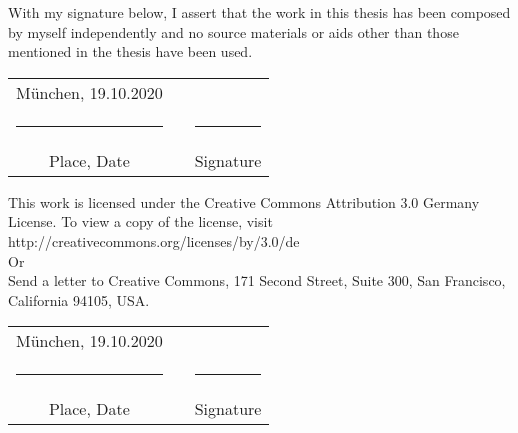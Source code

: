 \thispagestyle{plain}


\vspace*{1cm}
With my signature below, I assert that the work in this thesis has been composed by myself independently and no source materials or aids other than those mentioned in the thesis have been used.



\vspace{2cm}

\hspace{1cm}\begin{tabular}{ccc}
\vspace{-0.3cm}München, 19.10.2020 	&\hspace{4cm} 		& \\
\rule{4.5cm}{0.4pt}					&					&\rule{4.5cm}{0.4pt}\\
Place, Date							&					& Signature			
\end{tabular}

           		






\vspace{4cm}
This work is licensed under the Creative Commons Attribution 3.0 Germany License. To view a copy of the license, visit http://creativecommons.org/licenses/by/3.0/de\\

Or\\

Send a letter to Creative Commons, 171 Second Street, Suite 300, San Francisco, California 94105, USA.

\vspace{2cm}



\hspace{1cm}\begin{tabular}{ccc}
\vspace{-0.3cm}München, 19.10.2020 	&\hspace{4cm} 		& \\
\rule{4.5cm}{0.4pt}					&					&\rule{4.5cm}{0.4pt}\\
Place, Date							&					& Signature	
\end{tabular}
